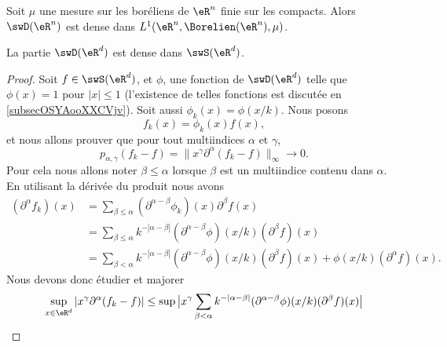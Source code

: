 \begin{theorem}      \label{ThoRWEoqY}
    Soit \( \mu\) une mesure sur les boréliens de \( \eR^n\) finie sur les compacts. Alors \( \swD(\eR^n)\) est dense dans \( L^1(\eR^n,\Borelien(\eR^n),\mu)\).
\end{theorem}

\begin{proposition}      \label{PROPooJNQZooIRbJei}
    La partie \( \swD(\eR^d)\) est dense dans \( \swS(\eR^d)\).
\end{proposition}

\begin{proof}
    Soit \( f\in \swS(\eR^d)\), et \( \phi\), une fonction de \( \swD(\eR^d)\) telle que \( \phi(x)=1\) pour \(| x |\leq 1 \) (l'existence de telles fonctions est discutée en \ref{subsecOSYAooXXCVjv}). Soit aussi \( \phi_k(x)=\phi(x/k)\). Nous posons
    \begin{equation}
        f_k(x)=\phi_k(x)f(x),
    \end{equation}
    et nous allons prouver que pour tout multiindices \( \alpha\) et \( \gamma\),
    \begin{equation}
        p_{\alpha,\gamma}(f_k-f)=\| x^{\gamma}\partial^{\alpha}(f_k-f)  \|_{\infty}\to 0.       
    \end{equation}
    Pour cela nous allons noter \(  \beta\leq \alpha  \) lorsque \( \beta\) est un multiindice contenu dans \( \alpha\). En utilisant la dérivée du produit nous avons
    \begin{subequations}
        \begin{align}
            (\partial^{\alpha}f_k)(x)&=\sum_{\beta\leq \alpha}(\partial^{\alpha-\beta}\phi_k)(x)\partial^{\beta}f(x)\\
            &=\sum_{\beta\leq \alpha}k^{-| \alpha-\beta |}(\partial^{\alpha-\beta}\phi)(x/k)(\partial^{\beta}f)(x)\\
            &=\sum_{\beta< \alpha}k^{-| \alpha-\beta |}(\partial^{\alpha-\beta}\phi)(x/k)(\partial^{\beta}f)(x) + \phi(x/k)(\partial^{\alpha}f)(x).
        \end{align}
    \end{subequations}
    Nous devons donc étudier et majorer
    \begin{equation}
        \begin{aligned}[]
        \sup_{x\in \eR^d}| x^{\gamma}\partial^{\alpha}(f_k-f) |&\leq \sup\big| x^{\gamma}  \sum_{\beta< \alpha}k^{-| \alpha-\beta |}(\partial^{\alpha-\beta}\phi)(x/k)(\partial^{\beta}f)(x)  \big|\\

\end{aligned}
\end{equation}
\end{proof}

